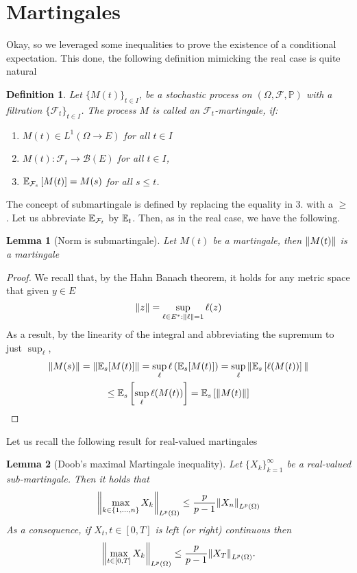 \documentclass[12pt]{article}
\newtheorem{lemma}{Lemma}
\newtheorem{definition}{Definition}
\begin{document}
\section{Martingales}
Okay, so we leveraged some inequalities to prove the existence of a conditional expectation. This done, the following definition mimicking the real case is quite natural
\begin{definition}
	Let $\{M(t)\}_{t\in I}$, be a stochastic process on $(\Omega, \mathcal{F}, \mathbb{P})$ with a filtration $\{\mathcal{F}_{t}\}_{t \in I}$. The process $M$ is called an $\mathcal{F}_{t}$-martingale, if:
	\begin{enumerate}
		\item $M(t)\in L^1(\Omega\to E)$ for all $t\in I$
		\item $M(t):\mathcal{F}_{t} \to \mathcal{B}(E)$ for all $t\in I$,
		\item $\mathbb{E}_{\mathcal{F}_{s}}\left[M(t)\right]=M(s)$ for all $s \leq t$.
	\end{enumerate}
\end{definition}
The concept of submartingale is  defined by replacing the equality in 3. with a $\geq$. Let us abbreviate $\mathbb{E}_{\mathcal{F}_t}$ by $\mathbb{E}_t$. Then, as in the real case, we have the following.
\begin{lemma}[Norm is submartingale]\label{norm is submart}
	Let $M(t)$ be a martingale, then $\norm{M(t)}$ is a martingale
\end{lemma}
\begin{proof}
	We recall that, by the Hahn Banach theorem, it holds for any metric space that given $y\in E$
	\begin{equation*}
		\norm{z}=\sup_{\ell\in E^*:\|\ell\|=1}\ell(z)
	\end{equation*}
	As a result, by the linearity of the integral and abbreviating the supremum to just $\sup_\ell$,
	\begin{multline*}
		\|M(s)\|=\|\mathbb{E}_{s}[M(t)]\|= \sup_\ell \ell\left(\mathbb{E}_{s}[M(t)]\right)=\sup_\ell\|{\mathbb{E}_{s}\left[\ell(M(t))\right]\|}\\
		\leq \mathbb{E}_{s}\left[\sup_\ell\ell(M(t))\right]=\mathbb{E}_{s}\left[\|M(t)\|\right]
	\end{multline*}
\end{proof}
Let us recall the following result for real-valued martingales
\begin{lemma}[Doob's maximal Martingale inequality]
	Let $\{X_k\}_{k=1}^\infty$ be a real-valued sub-martingale. Then it holds that
	\begin{equation*}
		\norm{\max_{k\in\{1,...,n\}}X_k}_{L^p(\Omega)}\leq \frac{p}{p-1}\norm{X_n}_{L^p(\Omega)}
	\end{equation*}
	As a consequence, if $X_t,t\in[0,T]$ is left (or right) continuous then
	\begin{equation*}
		\norm{\max_{t\in[0,T]}X_k}_{L^p(\Omega)}\leq \frac{p}{p-1}\norm{X_T}_{L^p(\Omega)}.
	\end{equation*}
\end{lemma}
\end{document}
